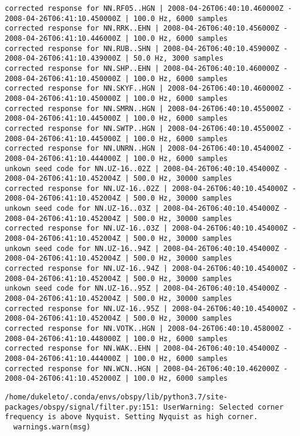 \documentclass[11pt]{article}
\begin{document}
\begin{Verbatim}[commandchars=\\\{\}]
corrected response for NN.RF05..HGN | 2008-04-26T06:40:10.460000Z - 2008-04-26T06:41:10.450000Z | 100.0 Hz, 6000 samples
corrected response for NN.RRK..EHN | 2008-04-26T06:40:10.456000Z - 2008-04-26T06:41:10.446000Z | 100.0 Hz, 6000 samples
corrected response for NN.RUB..SHN | 2008-04-26T06:40:10.459000Z - 2008-04-26T06:41:10.439000Z | 50.0 Hz, 3000 samples
corrected response for NN.SHP..EHN | 2008-04-26T06:40:10.460000Z - 2008-04-26T06:41:10.450000Z | 100.0 Hz, 6000 samples
corrected response for NN.SKYF..HGN | 2008-04-26T06:40:10.460000Z - 2008-04-26T06:41:10.450000Z | 100.0 Hz, 6000 samples
corrected response for NN.SMRN..HGN | 2008-04-26T06:40:10.455000Z - 2008-04-26T06:41:10.445000Z | 100.0 Hz, 6000 samples
corrected response for NN.SWTP..HGN | 2008-04-26T06:40:10.455000Z - 2008-04-26T06:41:10.445000Z | 100.0 Hz, 6000 samples
corrected response for NN.UNRN..HGN | 2008-04-26T06:40:10.454000Z - 2008-04-26T06:41:10.444000Z | 100.0 Hz, 6000 samples
unkown seed code for NN.UZ-16..02Z | 2008-04-26T06:40:10.454000Z - 2008-04-26T06:41:10.452004Z | 500.0 Hz, 30000 samples
corrected response for NN.UZ-16..02Z | 2008-04-26T06:40:10.454000Z - 2008-04-26T06:41:10.452004Z | 500.0 Hz, 30000 samples
unkown seed code for NN.UZ-16..03Z | 2008-04-26T06:40:10.454000Z - 2008-04-26T06:41:10.452004Z | 500.0 Hz, 30000 samples
corrected response for NN.UZ-16..03Z | 2008-04-26T06:40:10.454000Z - 2008-04-26T06:41:10.452004Z | 500.0 Hz, 30000 samples
unkown seed code for NN.UZ-16..94Z | 2008-04-26T06:40:10.454000Z - 2008-04-26T06:41:10.452004Z | 500.0 Hz, 30000 samples
corrected response for NN.UZ-16..94Z | 2008-04-26T06:40:10.454000Z - 2008-04-26T06:41:10.452004Z | 500.0 Hz, 30000 samples
unkown seed code for NN.UZ-16..95Z | 2008-04-26T06:40:10.454000Z - 2008-04-26T06:41:10.452004Z | 500.0 Hz, 30000 samples
corrected response for NN.UZ-16..95Z | 2008-04-26T06:40:10.454000Z - 2008-04-26T06:41:10.452004Z | 500.0 Hz, 30000 samples
corrected response for NN.VOTK..HGN | 2008-04-26T06:40:10.458000Z - 2008-04-26T06:41:10.448000Z | 100.0 Hz, 6000 samples
corrected response for NN.WAK..EHN | 2008-04-26T06:40:10.454000Z - 2008-04-26T06:41:10.444000Z | 100.0 Hz, 6000 samples
corrected response for NN.WCN..HGN | 2008-04-26T06:40:10.462000Z - 2008-04-26T06:41:10.452000Z | 100.0 Hz, 6000 samples

    \end{Verbatim}

    \begin{Verbatim}[commandchars=\\\{\}]
/home/dukeleto/.conda/envs/obspy/lib/python3.7/site-packages/obspy/signal/filter.py:151: UserWarning: Selected corner frequency is above Nyquist. Setting Nyquist as high corner.
  warnings.warn(msg)

    \end{Verbatim}
\end{document}
